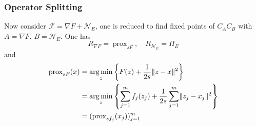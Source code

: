 
\begin{frame}
\frametitle{Operator Splitting}

Now consider $\mathcal{F} = \nabla F + \mathcal{N}_E$, one is reduced to find fixed points of $C_AC_B$ with $A = \nabla F$, $B = \mathcal{N}_E$. One has
$$R_{\nabla F} = \operatorname{prox}_{sF}, \quad R_{\mathcal{N}_E} = \Pi_{E}$$
and
\begin{align*}
\operatorname{prox}_{sF}(x) & = \operatorname*{arg\,min}_z \left\{ F(z) + \frac{1}{2s} \lVert z-x \rVert^2 \right\} \\
& = \operatorname*{arg\,min}_z \left\{ \sum_{j=1}^m f_j(z_j) + \frac{1}{2s} \sum_{j=1}^m \lVert z_j-x_j \rVert^2 \right\} \\
& = (\operatorname{prox}_{sf_j}(x_j))_{j=1}^m
\end{align*}

\end{frame}


